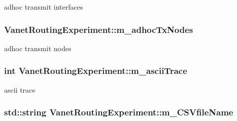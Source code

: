adhoc transmit interfaces 

\subsubsection[{\texorpdfstring{m\+\_\+adhoc\+Tx\+Nodes}{m_adhocTxNodes}}]{ Vanet\+Routing\+Experiment\+::m\+\_\+adhoc\+Tx\+Nodes\hspace{0.3cm}{\ttfamily [private]}}\hypertarget{classVanetRoutingExperiment_aaea34adc85cd667ea5d3371c3fa1e3dc}{}\label{classVanetRoutingExperiment_aaea34adc85cd667ea5d3371c3fa1e3dc}


adhoc transmit nodes 

\subsubsection[{\texorpdfstring{m\+\_\+ascii\+Trace}{m_asciiTrace}}]{\setlength{\rightskip}{0pt plus 5cm}int Vanet\+Routing\+Experiment\+::m\+\_\+ascii\+Trace\hspace{0.3cm}{\ttfamily [private]}}\hypertarget{classVanetRoutingExperiment_a2de6513e66df96777e2a8fbd9b7c615a}{}\label{classVanetRoutingExperiment_a2de6513e66df96777e2a8fbd9b7c615a}


ascii trace 

\subsubsection[{\texorpdfstring{m\+\_\+\+C\+S\+Vfile\+Name}{m_CSVfileName}}]{\setlength{\rightskip}{0pt plus 5cm}std\+::string Vanet\+Routing\+Experiment\+::m\+\_\+\+C\+S\+Vfile\+Name\hspace{0.3cm}{\ttfamily [private]}}\hypertarget{classVanetRoutingExperiment_a0fab315c81d7da9e59216c3790f55da4}{}\label{classVanetRoutingExperiment_a0fab315c81d7da9e59216c3790f55da4}


